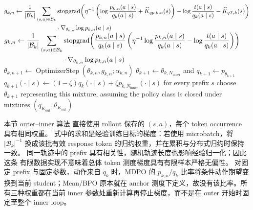 \begin{algorithm}[ht]
\begin{algorithmic}[1]
            \State $\begin{aligned}g_{k,n}\gets\frac1{|\mathcal B_k|}\sum_{(s,a)\in\mathcal B_k}&\operatorname{stopgrad}\!\left(\eta^{-1}\left(\log\frac{p_{k,n}(a\mid s)}{q_k(a\mid s)}+\widehat K_{qp,k,n}(s)\right)-\log\frac{t(a\mid s)}{q_k(a\mid s)}-\widehat K_{qT,k}(s)\right)\\&{}\cdot\nabla_{\theta_{k,n}}\log p_{k,n}(a\mid s)\end{aligned}$
            \State $\begin{aligned}g_{k,n}\gets\frac1{|\mathcal B_k|}\sum_{(s,a)\in\mathcal B_k}&\operatorname{stopgrad}\!\left(\frac{p_{k,n}(a\mid s)}{q_k(a\mid s)}\left(\eta^{-1}\log\frac{p_{k,n}(a\mid s)}{q_k(a\mid s)}-\log\frac{t(a\mid s)}{q_k(a\mid s)}\right)\right)\\&{}\cdot\nabla_{\theta_{k,n}}\log p_{k,n}(a\mid s)\end{aligned}$
        \EndIf
        \State $\theta_{k,n+1}\gets\operatorname{OptimizerStep}(\theta_{k,n},g_{k,n};\alpha_{k,n})$ 
    \EndFor
        \State $\theta_{k+1}\gets\theta_{k,N_{\mathrm{inner}}}$ and $q_{k+1}\gets p_{\theta_{k+1}}$
    \Else
        \State $q_{k+1}(\cdot\mid s)\gets(1-\zeta)q_k(\cdot\mid s)+\zeta p_{k,N_{\mathrm{inner}}}(\cdot\mid s)$ for every prefix $s$
        \State choose $\theta_{k+1}$ representing this mixture, assuming the policy class is closed under mixtures 
    \EndIf
\EndFor
\State \Return $(q_{K_{\mathrm{out}}},\theta_{K_{\mathrm{out}}})$
\end{algorithmic}
\end{algorithm}

本节 outer--inner 算法 直接使用 rollout 保存的 $(s,a)$，每个 token occurrence 具有相同权重。 式中的求和是经验训练目标的梯度：若使用 microbatch，将 $|\mathcal B_k|^{-1}$ 换成该批有效 response token 的归约权重，并在累积与分布式归约时保持一致。 同一轨迹中的 prefix 具有相关性，随机轨迹长度也影响经验归一化；因此这条 有限数据实现不意味着总体 token 测度梯度具有有限样本严格无偏性。 对固定 prefix 与固定参数，动作来自 $q_k$ 时，MDPO 的 $p_{k,n}/q_k$ 比率将条件动作期望变换到当前 student；Mean/BPO 原本就在 anchor 测度下定义，故没有该比率。所有三种权重都在当前 inner 参数处重新计算再停止梯度，而不是在 outer 开始时固定至整个 inner loop。

